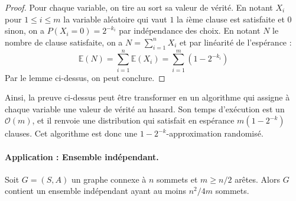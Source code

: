 \begin{proof}
Pour chaque variable, on tire au sort sa valeur de vérité. En notant $X_i$ pour $1\leq i \leq m$ la variable aléatoire qui vaut $1$ la $i$ème clause est satisfaite et $0$ sinon, on a $P(X_i =0) = 2^{-k_i}$ par indépendance des choix. En notant $N$ le nombre de clause satisfaite, on a $N= \sum_{i=1}^n X_i$ et par linéarité de l'espérance :
$$
\mathbb{E}(N) = \sum_{i=1}^n \mathbb{E}(X_i) = \sum_{i=1}^m (1-2^{-k_i})
$$
Par le lemme ci-dessus, on peut conclure.
\end{proof}

Ainsi, la preuve ci-dessus peut être transformer en un algorithme qui assigne à chaque variable une valeur de vérité au hasard. Son temps d'exécution est un $\mathcal{O}(m)$, et il renvoie une distribution qui satisfait en espérance $m(1-2^{-k})$ clauses. Cet algorithme est donc une $1-2^{-k}$-approximation randomisé. 

\paragraph{Application : Ensemble indépendant.}

\begin{theorem}
Soit $G=(S,A)$ un graphe connexe à $n$ sommets et $m \geq n/2$ arêtes. Alors $G$ contient un ensemble indépendant ayant au moins $n^2/4m$ sommets. 
\end{theorem}

